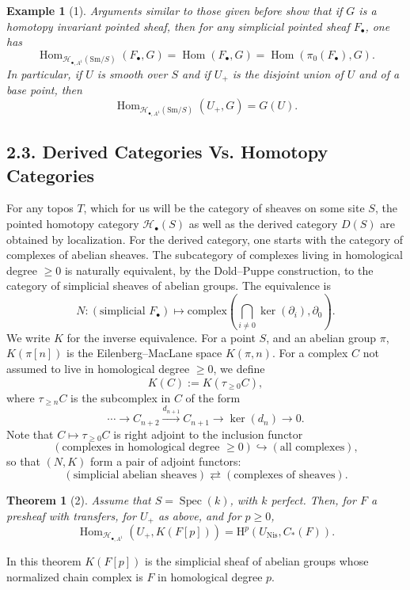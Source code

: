 \documentclass[11pt]{article}
\newcommand{\Nis}{\mathrm{Nis}}
\newcommand{\Sm}{\mathrm{Sm}}
\newcommand{\Spec}{\operatorname{Spec}}
\newcommand{\Hom}{\operatorname{Hom}}
\newcommand{\Hob}{\mathcal H_\bullet}
\newcommand{\HoA}{\mathcal H_{\bullet,A^1}}
\newcommand{\HH}{\mathrm H}
\theoremstyle{deligne}
\newtheorem*{theorem*}{Theorem}
\newtheorem*{example*}{Example}
\begin{document}
\begin{example*}[1]
Arguments similar to those given before show that if \(G\) is a homotopy invariant pointed sheaf, then for any simplicial pointed sheaf \(F_\bullet\), one has
\[
  \Hom_{\HoA(\Sm/S)}(F_\bullet,G)
  =\Hom(F_\bullet,G)=\Hom(\pi_0(F_\bullet),G).
\]
In particular, if \(U\) is smooth over \(S\) and if \(U_+\) is the disjoint union of \(U\) and of a base point, then
\[
  \Hom_{\HoA(\Sm/S)}(U_+,G)=G(U).
\]
\end{example*}

\subsection*{2.3. Derived Categories Vs. Homotopy Categories}

For any topos \(T\), which for us will be the category of sheaves on some site \(S\), the pointed homotopy category \(\Hob(S)\) as well as the derived category \(D(S)\) are obtained by localization. For the derived category, one starts with the category of complexes of abelian sheaves. The subcategory of complexes living in homological degree \(\ge0\) is naturally equivalent, by the Dold--Puppe construction, to the category of simplicial sheaves of abelian groups. The equivalence is
\[
  N:(\text{simplicial }F_\bullet)
  \longmapsto
  \text{complex}\left(\bigcap_{i\ne0}\ker(\partial_i),\partial_0\right).
\]
We write \(K\) for the inverse equivalence. For a point \(S\), and an abelian group \(\pi\), \(K(\pi[n])\) is the Eilenberg--MacLane space \(K(\pi,n)\). For a complex \(C\) not assumed to live in homological degree \(\ge0\), we define
\[
  K(C):=K(\tau_{\ge0}C),
\]
where \(\tau_{\ge n}C\) is the subcomplex in \(C\) of the form
\[
  \cdots \longrightarrow C_{n+2}\xrightarrow{d_{n+1}}C_{n+1}
  \longrightarrow \ker(d_n)\longrightarrow0.
\]
Note that \(C\mapsto\tau_{\ge0}C\) is right adjoint to the inclusion functor
\[
  (\text{complexes in homological degree }\ge0)
  \hookrightarrow
  (\text{all complexes}),
\]
so that \((N,K)\) form a pair of adjoint functors:
\[
  (\text{simplicial abelian sheaves})\rightleftarrows(\text{complexes of sheaves}).
\]

\begin{theorem*}[2]
Assume that \(S=\Spec(k)\), with \(k\) perfect. Then, for \(F\) a presheaf with transfers, for \(U_+\) as above, and for \(p\ge0\),
\[
  \Hom_{\HoA}(U_+,K(F[p]))=\HH^p(U_{\Nis},C_*(F)).
\]
\end{theorem*}

In this theorem \(K(F[p])\) is the simplicial sheaf of abelian groups whose normalized chain complex is \(F\) in homological degree \(p\).
\end{document}
